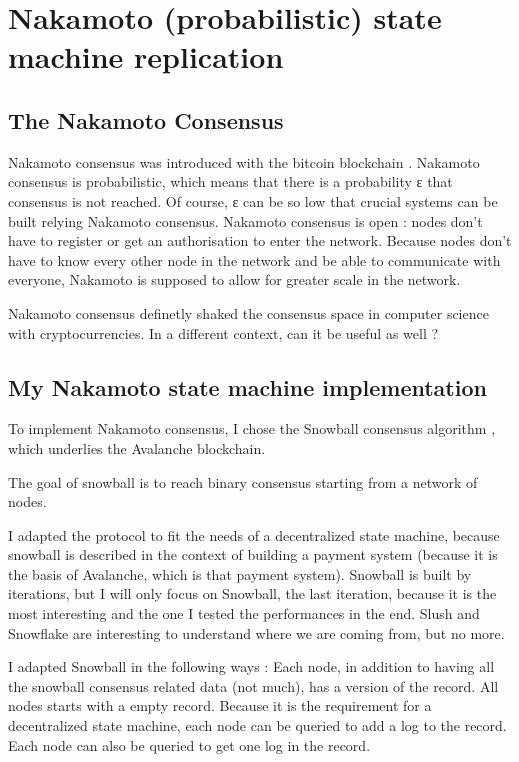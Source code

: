 \documentclass[11pt, twocolumn]{article}
\begin{document}
\section{Nakamoto (probabilistic) state machine replication}
\subsection{The Nakamoto Consensus}

Nakamoto consensus was introduced with the bitcoin blockchain \cite{bitcoin}. Nakamoto consensus is probabilistic, which means that there is a probability ε that consensus is not reached.
Of course, ε can be so low that crucial systems can be built relying Nakamoto consensus. Nakamoto consensus is open : nodes don't have to register or get an authorisation to enter the network.
Because nodes don't have to know every other node in the network and be able to communicate with everyone, Nakamoto is supposed to allow for greater scale in the network.

Nakamoto consensus definetly shaked the consensus space in computer science with cryptocurrencies. In a different context, can it be useful as well ?

\subsection{My Nakamoto state machine implementation}

To implement Nakamoto consensus, I chose the Snowball consensus algorithm \cite{snowprotocol}, which underlies the Avalanche blockchain.

The goal of snowball is to reach binary consensus starting from a network of nodes.

I adapted the protocol to fit the needs of a decentralized state machine, because snowball is described in the context of building a payment system (because it is the basis of Avalanche, which is that payment system).
Snowball is built by iterations, but I will only focus on Snowball, the last iteration, because it is the most interesting and the one I tested the performances in the end. Slush and Snowflake are interesting to understand
where we are coming from, but no more.

I adapted Snowball in the following ways : Each node, in addition to having all the snowball consensus related data (not much), has a version of the record. All nodes starts with a empty record.
Because it is the requirement for a decentralized state machine, each node can be queried to add a log to the record. Each node can also be queried to get one log in the record.
\end{document}
